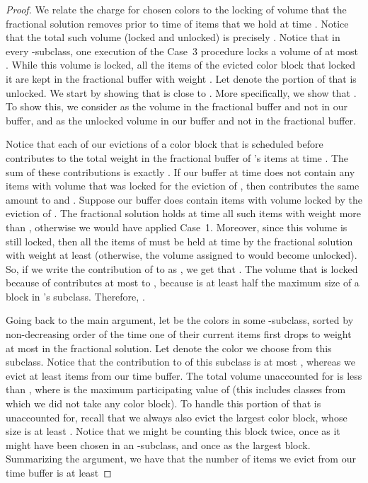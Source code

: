 \documentclass[12pt]{article}
\begin{document}
\begin{proof}
We relate the charge for chosen colors to the locking of volume that 
the fractional solution removes prior to time  of items that we 
hold at time . Notice that the total such volume (locked and
unlocked) is precisely . Notice that in every -subclass, 
one execution of the Case~3 procedure locks a volume of at most
. While this volume is locked, all the items of
the evicted color block that locked it are kept in the fractional
buffer with weight . Let  denote the 
portion of  that is unlocked. 
We start by showing that  is close to . More 
specifically, we show that 
.
To show this, we consider  as the volume in the fractional
buffer and not in our buffer, and  as the unlocked volume 
in our buffer and not in the fractional buffer.

Notice that each of our evictions of a color block
 that is scheduled before  contributes to  the total 
weight in the fractional buffer of 's items at time . The
sum of these contributions is exactly . If our buffer at time
 does not contain any items with volume that was locked for 
the eviction of , then  contributes the same amount to 
and . Suppose our buffer does contain items
with volume locked by the eviction of . The fractional solution holds 
at time  all such items with weight more than , 
otherwise we would have applied Case~1. Moreover, since this volume
is still locked, then all the items of  must be held at time  by 
the fractional solution with weight at least  (otherwise, the
volume assigned to  would become unlocked).
So, if we 
write the contribution of  to  as , we get 
that . The volume that is locked
because of  contributes at most  to 
, because  is at least half the maximum size of
a block in 's subclass. Therefore,
.

Going back to the main argument, let  be
the colors in some -subclass, sorted by non-decreasing 
order of the time one of their current items first drops to weight 
at most  in the fractional solution. Let  denote
the color we choose from this subclass. Notice that the contribution 
to  of this subclass is at most ,
whereas we evict at least  items from our
time  buffer. The total  volume unaccounted
for is less than ,
where  is the maximum participating value of  
(this includes classes from which we did not take any color
block). To handle this portion of  that is unaccounted
for, recall that we always also evict the largest color block,
whose size is at least . Notice that we might
be counting this block twice, once as it might have been chosen
in an -subclass, and once as the largest block.
Summarizing the argument, we have that the number of items 
we evict from our time  buffer is at least 


\end{proof}
\end{document}
